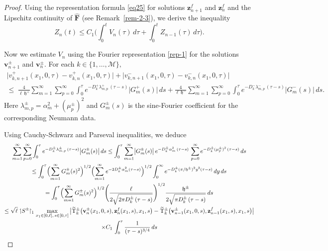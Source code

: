 \documentclass[reqno]{amsart}            %
\numberwithin{equation}{section}
\begin{document}
\begin{proof}
		
		Using the representation formula \eqref{eq25} for solutions $\mathbf{z}^f_{n+1}$ and $\mathbf{z}^f_n$ and the Lipschitz continuity of $\widehat{ \mathbf{F}}$ (see Remark~\ref{rem-2-3}), we derive the inequality 
		\begin{equation}\label{Z-n}
			Z_n(t) \le C_1 \bigg(\int_0^t V_n(\tau) \, d\tau + \int_0^t Z_{n-1}(\tau)\, d\tau\bigg).
		\end{equation}
		
		Now we estimate $V_n$ using the Fourier representation \eqref{rep-1} for the solutions $\mathbf{v}^\pm_{n+1}$ and $\mathbf{v}^\pm_{n}.$ For each $k\in \{1,\ldots,\mathcal{M}\},$ 
		\begin{multline}\label{dif-v-1}
			\big|v^+_{k, n+1}(x_1, 0, \tau) - v^+_{k, n}(x_1, 0, \tau)\big|
			+
			\big|v^-_{k, n+1}(x_1, 0, \tau) - v^-_{k, n}(x_1, 0, \tau)\big|
			\\	
			\le\; \frac{4}{\ell \,\mathfrak{h}^+}
			\sum_{m=1}^{\infty}\sum_{p=0}^{\infty}
			\int_{0}^{\tau}e^{-D^+_k \lambda^+_{m,p}\, (\tau-s)}\bigl|G^+_{m}(s)\bigr|\,ds + \frac{4}{\ell \,\mathfrak{h}^-}\sum_{m=1}^{\infty}\sum_{p=0}^{\infty}
			\int_{0}^{\tau}e^{-D^-_k\lambda^-_{m,p} \, (\tau-s)}\bigl|G^-_{m}(s)\bigr|\,ds.
		\end{multline}
		Here $\lambda^{\pm}_{m,p}=\alpha_{m}^{2}+(\mu^{\pm}_{p})^{2}$ and $G^{\pm}_{m}(s)$ is the sine-Fourier coefficient for the corresponding Neumann data.
		
		Using Cauchy-Schwarz and Parseval inequalities, we deduce
		\begin{multline}\label{dif-v-2}
			\sum_{m=1}^{\infty}\sum_{p=0}^{\infty}
			\int_{0}^{\tau}e^{-D^\pm_k \lambda^\pm_{m,p}\, (\tau-s)}\bigl|G^\pm_{m}(s)\bigr|\,ds \le 
			\int_{0}^{\tau} \sum_{m=1}^{\infty} \bigl|G^\pm_{m}(s)\bigr|\, 
			e^{-D^\pm_k \alpha^2_m\, (\tau-s)}\, \sum_{p=0}^{\infty} e^{-D^\pm_k (\mu^\pm_{p})^2\, (\tau-s)}\, ds	
			\\
			\le 
			\int_{0}^{\tau} \Bigl(\sum_{m=1}^\infty G^\pm_m(s)^2\Bigr)^{1/2}
			\Bigl(\sum_{m=1}^\infty e^{-2 D^\pm_k\alpha_m^2 (\tau - s)}\Bigr)^{1/2}
			\int_0^\infty e^{- D^\pm_k (\pi/\mathfrak{h}^\pm)^2 y^2 (\tau- s)}\,dy \, ds
			\\
			=
			\int_{0}^{\tau} \Bigl(\sum_{m=1}^\infty G^\pm_m(s)^2\Bigr)^{1/2}
			\Biggl(\frac{\ell}{2 \sqrt{2 \pi D^\pm_k \, (\tau -s)}} \Biggr)^{1/2}
			\frac{\mathfrak{h}^\pm}{2 \sqrt{ \pi D^\pm_k \, (\tau -s)}}\, ds
			\\
			\le
			\sqrt{\ell} \upharpoonleft\!\! {S}^\pm\!\!\upharpoonright_1 \max_{x_1\in [0,\ell], \, s \in [0, \tau]} \big|\widetilde{\Upsilon}_k^\pm\big(\mathbf{v}^\pm_{n}(x_1,0,s), \mathbf{z}^f_{n}(x_1,s), x_1, s \big) -
			\widetilde{\Upsilon}_k^\pm\big(\mathbf{v}^\pm_{n-1}(x_1,0,s), \mathbf{z}^f_{n-1}(x_1,s), x_1, s \big)\big| 
			\\
			\times C_1 \, \int_{0}^{\tau} \frac{1}{(\tau -s)^{3/4}} \, ds 	
		\end{multline}
		

\end{proof}
\end{document}

